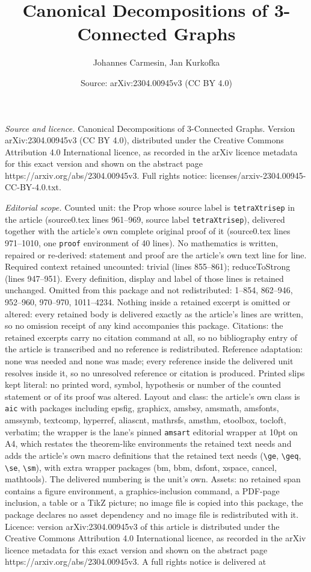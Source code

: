 \documentclass[10pt,a4paper]{amsart}
\title[Canonical Decompositions of 3-Connected Graphs]{Canonical Decompositions of 3-Connected Graphs}
\author{Johannes Carmesin, Jan Kurkofka}
\date{Source: arXiv:2304.00945v3 (CC BY 4.0)}
\begin{document}
\maketitle

\noindent\emph{Source and licence.} Canonical Decompositions of 3-Connected Graphs. Version arXiv:2304.00945v3 (CC BY 4.0), distributed under the Creative Commons Attribution 4.0 International licence, as recorded in the arXiv licence metadata for this exact version and shown on the abstract page https://arxiv.org/abs/2304.00945v3. Full rights notice: licenses/arxiv-2304.00945-CC-BY-4.0.txt.\par\smallskip

\noindent\textit{Editorial scope.} Counted unit: the Prop whose source label is \texttt{tetraXtrisep} in the article (source0.tex lines 961--969, source label \texttt{tetraXtrisep}), delivered together with the article's own complete original proof of it (source0.tex lines 971--1010, one \texttt{proof} environment of 40 lines). No mathematics is written, repaired or re-derived: statement and proof are the article's own text line for line. Required context retained uncounted: trivial (lines 855--861); reduceToStrong (lines 947--951). Every definition, display and label of those lines is retained unchanged. Omitted from this package and not redistributed: 1--854, 862--946, 952--960, 970--970, 1011--4234. Nothing inside a retained excerpt is omitted or altered: every retained body is delivered exactly as the article's lines are written, so no omission receipt of any kind accompanies this package. Citations: the retained excerpts carry no citation command at all, so no bibliography entry of the article is transcribed and no reference is redistributed. Reference adaptation: none was needed and none was made; every reference inside the delivered unit resolves inside it, so no unresolved reference or citation is produced. Printed slips kept literal: no printed word, symbol, hypothesis or number of the counted statement or of its proof was altered. Layout and class: the article's own class is \texttt{aic} with packages including epsfig, graphicx, amsbsy, amsmath, amsfonts, amssymb, textcomp, hyperref, aliascnt, mathrsfs, amsthm, etoolbox, tocloft, verbatim; the wrapper is the lane's pinned \texttt{amsart} editorial wrapper at 10pt on A4, which restates the theorem-like environments the retained text needs and adds the article's own macro definitions that the retained text needs (\texttt{\textbackslash ge}, \texttt{\textbackslash geq}, \texttt{\textbackslash se}, \texttt{\textbackslash sm}), with extra wrapper packages (bm, bbm, dsfont, xspace, cancel, mathtools). The delivered numbering is the unit's own. Assets: no retained span contains a figure environment, a graphics-inclusion command, a PDF-page inclusion, a table or a TikZ picture; no image file is copied into this package, the package declares no asset dependency and no image file is redistributed with it. Licence: version arXiv:2304.00945v3 of this article is distributed under the Creative Commons Attribution 4.0 International licence, as recorded in the arXiv licence metadata for this exact version and shown on the abstract page https://arxiv.org/abs/2304.00945v3. A full rights notice is delivered at 
\end{document}
